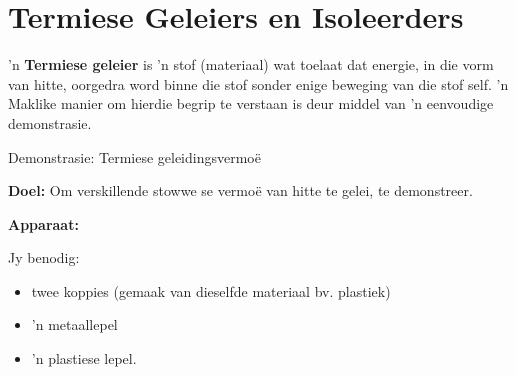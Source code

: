             \section{Termiese Geleiers en Isoleerders}
            \nopagebreak
      \label{m38706*id66527}'n \textbf{Termiese geleier} is 'n stof (materiaal) wat toelaat dat energie, in die vorm van hitte, oorgedra word binne die stof sonder enige beweging van die stof self. 'n Maklike manier om hierdie begrip te verstaan is deur middel van 'n eenvoudige demonstrasie.\par 
\label{m38706*secfhsst!!!underscore!!!id453}
            \begin{g_experiment}{Demonstrasie: Termiese geleidingsvermo\"e}{
            \nopagebreak
            \label{m38706*id66568}\noindent{}\textbf{Doel: }\newline
      Om verskillende stowwe se vermoë van hitte te gelei, te demonstreer.\par 
      \label{m38706*id66588}\noindent{}\textbf{Apparaat: }\newline
\begin{minipage}{.5\textwidth}
Jy benodig:
\begin{itemize}
 \item twee koppies (gemaak van dieselfde materiaal bv. plastiek)
\item 'n metaallepel
\item 'n plastiese lepel.
\end{itemize} 
\end{minipage}
\begin{minipage}{.5\textwidth}
	\begin{figure}[H] %
    \begin{center}
    \end{center}
 \end{figure} 

\end{minipage}}
\end{g_experiment}
